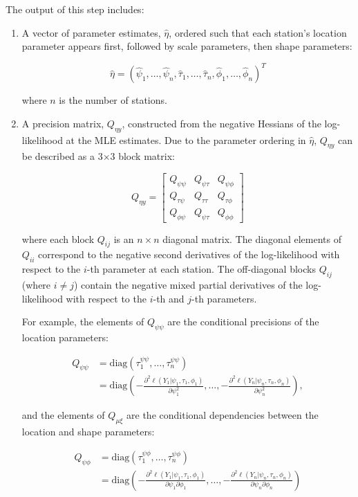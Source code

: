 \documentclass[
  letterpaper,
  DIV=11,
  numbers=noendperiod]{scrartcl}
\begin{document}
The output of this step includes:

\begin{enumerate}
\def\labelenumi{\arabic{enumi}.}
\item
  A vector of parameter estimates, \(\hat\eta\), ordered such that each
  station's location parameter appears first, followed by scale
  parameters, then shape parameters:

  \[
  \hat{\eta} = (\hat{\psi}_1, \ldots, \hat{\psi}_n, \hat{\tau}_1, \ldots, \hat{\tau}_n, \hat{\phi}_1, \ldots, \hat{\phi}_n)^T
  \]

  where \(n\) is the number of stations.
\item
  A precision matrix, \(Q_{\eta y}\), constructed from the negative
  Hessians of the log-likelihood at the MLE estimates. Due to the
  parameter ordering in \(\hat\eta\), \(Q_{\eta y}\) can be described as
  a 3×3 block matrix:

  \[
  Q_{\eta y} = \begin{bmatrix}
  Q_{\psi\psi} & Q_{\psi\tau} & Q_{\psi\phi} \\
  Q_{\tau\psi} & Q_{\tau\tau} & Q_{\tau\phi} \\
  Q_{\phi\psi} & Q_{\psi\tau} & Q_{\phi\phi}
  \end{bmatrix}
  \]

  where each block \(Q_{ij}\) is an \(n \times n\) diagonal matrix. The
  diagonal elements of \(Q_{ii}\) correspond to the negative second
  derivatives of the log-likelihood with respect to the \(i\)-th
  parameter at each station. The off-diagonal blocks \(Q_{ij}\) (where
  \(i \neq j\)) contain the negative mixed partial derivatives of the
  log-likelihood with respect to the \(i\)-th and \(j\)-th parameters.

  For example, the elements of \(Q_{\psi\psi}\) are the conditional
  precisions of the location parameters:

  \[
  \begin{aligned}
  Q_{\psi\psi} &=  \text{diag}\left(\tau^{\psi\psi}_1, \dots, \tau^{\psi\psi}_n\right)\\
  &= \text{diag}\left(-\frac{\partial^2 \ell(Y_1|\psi_1,\tau_1,\phi_1)}{\partial \psi_1^2}, \ldots, -\frac{\partial^2 \ell(Y_n|\psi_n,\tau_n,\phi_n)}{\partial \psi_n^2}\right),
  \end{aligned}
  \]

  and the elements of \(Q_{\mu\xi}\) are the conditional dependencies
  between the location and shape parameters:

  \[
  \begin{aligned}
  Q_{\psi\phi} &= \text{diag}\left(\tau^{\psi\phi}_1, \dots, \tau^{\psi\phi}_n\right) \\
  &= \text{diag}\left(-\frac{\partial^2 \ell(Y_1|\psi_1,\tau_1,\phi_1)}{\partial \psi_1\partial \phi_1}, \ldots, -\frac{\partial^2 \ell(Y_n|\psi_n,\tau_n,\phi_n)}{\partial \psi_n\partial \phi_n}\right)
  \end{aligned}
  \]
\end{enumerate}
\end{document}
